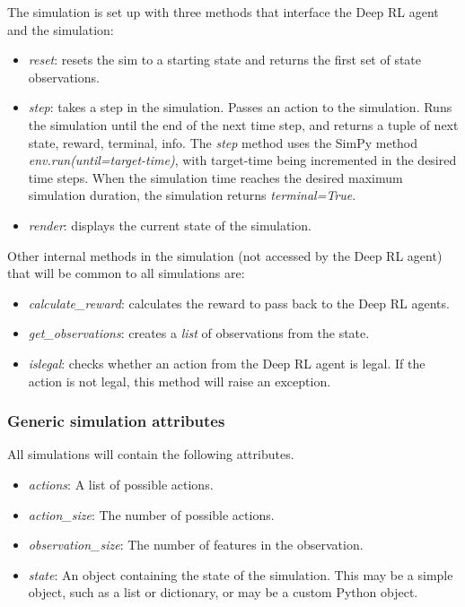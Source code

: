 \documentclass{article}
\begin{document}
\begin{multicols}{2}
The simulation is set up with three methods that interface the Deep RL agent and the simulation:

\begin{itemize}
    \item \emph{reset}: resets the sim to a starting state and returns the first set of state observations.
    \item \emph{step}: takes a step in the simulation. Passes an action to the simulation. Runs the simulation until the end of the next time step, and returns a tuple of next state, reward, terminal, info. The \emph{step} method uses the SimPy method \emph{env.run(until=target-time)}, with target-time being incremented in the desired time steps. When the simulation time reaches the desired maximum simulation duration, the simulation returns \emph{terminal=True}.
    \item \emph{render}: displays the current state of the simulation.
    
\end{itemize}

Other internal methods in the simulation (not accessed by the Deep RL agent) that will be common to all simulations are:

\begin{itemize}
    \item \emph{calculate\_reward}: calculates the reward to pass back to the Deep RL agents.
    \item \emph{get\_observations}: creates a \emph{list} of observations from the state.
    \item \emph{islegal}: checks whether an action from the Deep RL agent is legal. If the action is not legal, this method will raise an exception.
\end{itemize}

\subsubsection{Generic simulation attributes}

All simulations will contain the following attributes.

\begin{itemize}
    \item \emph{actions}: A list of possible actions.
    \item \emph{action\_size}: The number of possible actions.
    \item \emph{observation\_size}: The number of features in the observation.
    \item \emph{state}: An object containing the state of the simulation. This may be a simple object, such as a list or dictionary, or may be a custom Python object.
\end{itemize}


\end{multicols}
\end{document}
